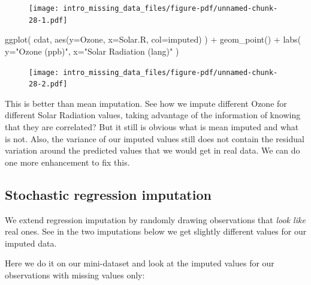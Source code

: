 \documentclass[
  letterpaper,
  DIV=11,
  numbers=noendperiod]{scrreprt}
\newenvironment{Shaded}{\begin{snugshade}}{\end{snugshade}}
\newcommand{\AttributeTok}[1]{\textcolor[rgb]{0.49,0.56,0.16}{#1}}
\newcommand{\FunctionTok}[1]{\textcolor[rgb]{0.02,0.16,0.49}{#1}}
\newcommand{\NormalTok}[1]{\textcolor[rgb]{0.00,0.44,0.13}{#1}}
\newcommand{\SpecialCharTok}[1]{\textcolor[rgb]{0.25,0.44,0.63}{#1}}
\newcommand{\StringTok}[1]{\textcolor[rgb]{0.25,0.44,0.63}{#1}}
\begin{document}
\begin{figure}[H]

{\centering \texttt{[image: intro\_missing\_data\_files/figure-pdf/unnamed-chunk-28-1.pdf]}

}

\end{figure}

\begin{Shaded}
\begin{Highlighting}[]
\FunctionTok{ggplot}\NormalTok{( cdat, }\FunctionTok{aes}\NormalTok{(}\AttributeTok{y=}\NormalTok{Ozone, }\AttributeTok{x=}\NormalTok{Solar.R, }\AttributeTok{col=}\NormalTok{imputed) ) }\SpecialCharTok{+}
    \FunctionTok{geom\_point}\NormalTok{() }\SpecialCharTok{+}
    \FunctionTok{labs}\NormalTok{( }\AttributeTok{y=}\StringTok{"Ozone (ppb)"}\NormalTok{, }\AttributeTok{x=}\StringTok{"Solar Radiation (lang)"}\NormalTok{ )}
\end{Highlighting}
\end{Shaded}

\begin{figure}[H]

{\centering \texttt{[image: intro\_missing\_data\_files/figure-pdf/unnamed-chunk-28-2.pdf]}

}

\end{figure}

This is better than mean imputation. See how we impute different Ozone
for different Solar Radiation values, taking advantage of the
information of knowing that they are correlated? But it still is obvious
what is mean imputed and what is not. Also, the variance of our imputed
values still does not contain the residual variation around the
predicted values that we would get in real data. We can do one more
enhancement to fix this.

\hypertarget{stochastic-regression-imputation}{%
\subsection{Stochastic regression
imputation}\label{stochastic-regression-imputation}}

We extend regression imputation by randomly drawing observations that
\emph{look like} real ones. See in the two imputations below we get
slightly different values for our imputed data.

Here we do it on our mini-dataset and look at the imputed values for our
observations with missing values only:
\end{document}
